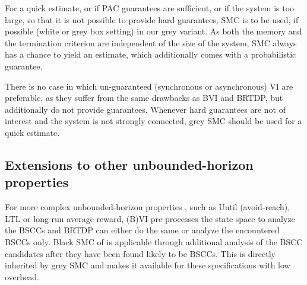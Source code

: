 For a quick estimate, or if PAC guarantees are sufficient, or if the system is too large, so that it is not possible to provide hard guarantees, SMC is to be used, if possible (white or grey box setting) in our grey variant.
As both the memory and the termination criterion are independent of the size of the system, SMC always has a chance to yield an estimate, which additionally comes with a probabilistic guarantee.

There is no case in which un-guaranteed (synchronous or asynchronous) VI are preferable, as they suffer from the same drawbacks as BVI and BRTDP, but additionally do not provide guarantees.
Whenever hard guarantees are not of interest and the system is not strongly connected, grey SMC should be used for a quick estimate.


\subsection{Extensions to other unbounded-horizon properties}
	For more complex unbounded-horizon properties \cite{BK08}, such as Until (avoid-reach), LTL or long-run average reward, (B)VI pre-processes the state space to analyze the BSCCs \cite{BK08} and BRTDP \cite{atva14} can either do the same  or analyze the encountered BSCCs only. 
	Black SMC of \cite{DHKPjournal} is applicable through additional analysis of the BSCC candidates after they have been found likely to be BSCCs.
	This is directly inherited by grey SMC and makes it available for these specifications with low overhead.



%
%
%
%
%




